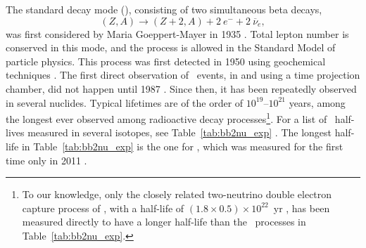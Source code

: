 The standard decay mode (\bbtnu), consisting of two simultaneous beta decays,
\begin{equation}
(Z,A) \rightarrow (Z+2,A) + 2\ e^{-} + 2\ \overline{\nu}_{e},
\label{eq:bb2nu}
\end{equation}
was first considered by Maria Goeppert-Mayer in 1935 \cite{Goeppert-Mayer:1935uil}. Total lepton number is conserved in this mode, and the process is allowed in the Standard Model of particle physics. This process was first detected in 1950 using geochemical techniques \cite{Inghram:1950qv}. The first direct observation of \bbtnu\ events, in  and using a time projection chamber, did not happen until 1987 \cite{Elliott:1987kp,Moe:2014ioa}. Since then, it has been repeatedly observed in several nuclides. Typical lifetimes are of the order of $10^{19}$--$10^{21}$ years, among the longest ever observed among radioactive decay processes\footnote{To our knowledge, only the closely related two-neutrino double electron capture process of , with a half-life of $(1.8\times 0.5)\times 10^{22}$~yr \cite{XENON:2019dti}, has been measured directly to have a longer half-life than the \bbtnu\ processes in Table~\ref{tab:bb2nu_exp}.}. For a list of \bbtnu\ half-lives measured in several isotopes, see Table~\ref{tab:bb2nu_exp} \cite{Barabash:2020nck}. The longest half-life in Table~\ref{tab:bb2nu_exp} is the one for , which was measured for the first time only in 2011 \cite{EXO-200:2011xzf}.

